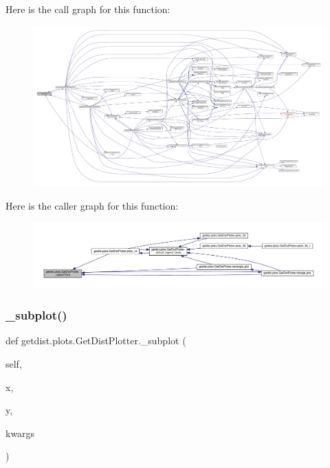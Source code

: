Here is the call graph for this function\+:
\nopagebreak
\begin{figure}[H]
\begin{center}
\leavevmode
\includegraphics[width=350pt]{classgetdist_1_1plots_1_1GetDistPlotter_a0f88fbf39ce5aa636bcb33ba1aaf26dd_cgraph}
\end{center}
\end{figure}
Here is the caller graph for this function\+:
\nopagebreak
\begin{figure}[H]
\begin{center}
\leavevmode
\includegraphics[width=350pt]{classgetdist_1_1plots_1_1GetDistPlotter_a0f88fbf39ce5aa636bcb33ba1aaf26dd_icgraph}
\end{center}
\end{figure}
\mbox{\label{classgetdist_1_1plots_1_1GetDistPlotter_aa9058a1f333a84c5d0c7b8f5c5a83da3}} 
\subsubsection{\texorpdfstring{\+\_\+subplot()}{\_subplot()}}
{\footnotesize\ttfamily def getdist.\+plots.\+Get\+Dist\+Plotter.\+\_\+subplot (\begin{DoxyParamCaption}\item[{}]{self,  }\item[{}]{x,  }\item[{}]{y,  }\item[{}]{kwargs }\end{DoxyParamCaption})\hspace{0.3cm}{\ttfamily [private]}}

